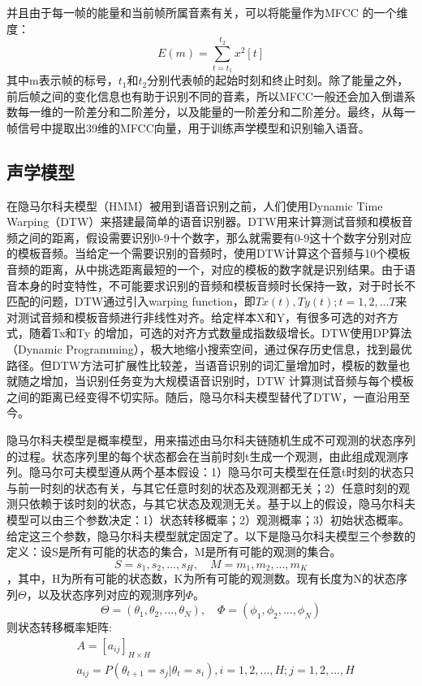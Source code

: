 并且由于每一帧的能量和当前帧所属音素有关，可以将能量作为MFCC 的一个维度：\begin{equation}E(m) = \sum_{t=t_1}^{t_2} x^2[t]\end{equation}
其中m表示帧的标号，$t_1$和$t_2$分别代表帧的起始时刻和终止时刻。除了能量之外，前后帧之间的变化信息也有助于识别不同的音素，所以MFCC一般还会加入倒谱系数每一维的一阶差分和二阶差分，以及能量的一阶差分和二阶差分。最终，从每一帧信号中提取出39维的MFCC向量，用于训练声学模型和识别输入语音。
\subsection{声学模型}\label{acoustic model introduction}
在隐马尔科夫模型（HMM）被用到语音识别之前，人们使用Dynamic Time Warping（DTW）\cite{sakoe1978dynamic}来搭建最简单的语音识别器。DTW用来计算测试音频和模板音频之间的距离，假设需要识别0-9十个数字，那么就需要有0-9这十个数字分别对应的模板音频。当给定一个需要识别的音频时，使用DTW计算这个音频与10个模板音频的距离，从中挑选距离最短的一个，对应的模板的数字就是识别结果。由于语音本身的时变特性，不可能要求识别的音频和模板音频时长保持一致，对于时长不匹配的问题，DTW通过引入warping function，即$Tx(t), Ty(t);t=1,2,...T$来对测试音频和模板音频进行非线性对齐。给定样本X和Y，有很多可选的对齐方式，随着Tx和Ty 的增加，可选的对齐方式数量成指数级增长。DTW使用DP算法（Dynamic Programming），极大地缩小搜索空间，通过保存历史信息，找到最优路径。但DTW方法可扩展性比较差，当语音识别的词汇量增加时，模板的数量也就随之增加，当识别任务变为大规模语音识别时，DTW 计算测试音频与每个模板之间的距离已经变得不切实际。随后，隐马尔科夫模型替代了DTW，一直沿用至今。

隐马尔科夫模型是概率模型，用来描述由马尔科夫链随机生成不可观测的状态序列的过程。状态序列里的每个状态都会在当前时刻t生成一个观测，由此组成观测序列。隐马尔可夫模型遵从两个基本假设：1）隐马尔可夫模型在任意t时刻的状态只与前一时刻的状态有关，与其它任意时刻的状态及观测都无关；2）任意时刻的观测只依赖于该时刻的状态，与其它状态及观测无关。基于以上的假设，隐马尔科夫模型可以由三个参数决定：1）状态转移概率；2）观测概率；3）初始状态概率。给定这三个参数，隐马尔科夫模型就定固定了。以下是隐马尔科夫模型三个参数的定义：设S是所有可能的状态的集合，M是所有可能的观测的集合。$$S={s_1,s_2,...,s_H}, \quad M={m_1,m_2,...,m_K}$$，其中，H为所有可能的状态数，K为所有可能的观测数。现有长度为N的状态序列$\Theta$，以及状态序列对应的观测序列$\Phi$。$$\Theta=(\theta_1,\theta_2,...,\theta_N), \quad \Phi=(\phi_1,\phi_2,...,\phi_N)$$则状态转移概率矩阵:
\begin{eqnarray}
  &A=[a_{ij}]_{H\times H} \\
  &a_{ij} = P(\theta_{t+1}=s_j | \theta_t=s_i), i=1,2,...,H; j=1,2,...,H
\end{eqnarray}

